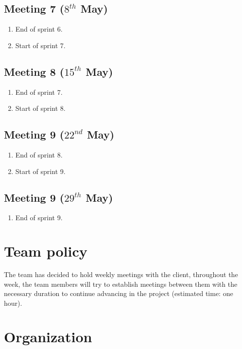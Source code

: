\subsection{Meeting 7 ($8^{th}$ May)}
\begin{enumerate}
	\item End of sprint 6.
	\item Start of sprint 7.
\end{enumerate}

\subsection{Meeting 8 ($15^{th}$ May)}
\begin{enumerate}
	\item End of sprint 7.
	\item Start of sprint 8.
\end{enumerate}

\subsection{Meeting 9 ($22^{nd}$ May)}
\begin{enumerate}
	\item End of sprint 8.
	\item Start of sprint 9.
\end{enumerate}

\subsection{Meeting 9 ($29^{th}$ May)}
\begin{enumerate}
	\item End of sprint 9.
\end{enumerate}

\section{Team policy}
The team has decided to hold weekly meetings with the client, throughout the week, the team members will try to establish meetings between them with the necessary duration to continue advancing in the project (estimated time: one hour).

\section{Organization}
